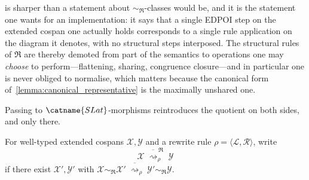 \begin{remark}\label{remark:no_modulo_raw}
 is sharper than a statement about $\sim_{\mathfrak{R}}$-classes
would be, and it is the statement one wants for an implementation: it says that a single
EDPOI step on the extended cospan one actually holds corresponds to a single rule
application on the diagram it denotes, with no structural steps interposed.
The structural rules of $\mathfrak{R}$ are thereby demoted from part of the semantics to
operations one may \emph{choose} to perform---flattening, sharing, congruence closure---and
in particular one is never obliged to normalise, which matters because the canonical form
of~\cref{lemma:canonical_representative} is the maximally unshared one.
\end{remark}

Passing to $\catname{SLat}$-morphisms reintroduces the quotient on both sides, and only
there.

\begin{definition}\label{def:rewriting_modulo}
For well-typed extended cospans $\mathcal{X}, \mathcal{Y}$ and a rewrite rule
$\rho = \langle \mathcal{L}, \mathcal{R} \rangle$, write
\[
\mathcal{X} \;\overline{\rightsquigarrow}^{\,\mathfrak{R}}_{\rho}\; \mathcal{Y}
\]
if there exist $\mathcal{X}', \mathcal{Y}'$ with
$\mathcal{X} \sim_{\mathfrak{R}} \mathcal{X}'
 \;\overline{\rightsquigarrow}_{\rho}\;
 \mathcal{Y}' \sim_{\mathfrak{R}} \mathcal{Y}$.
\end{definition}

